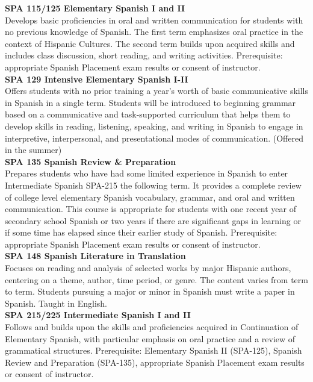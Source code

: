 \documentclass[
  letterpaper,
]{scrbook}
\begin{document}
\textbf{SPA 115/125 Elementary Spanish I and II}\\
Develops basic proficiencies in oral and written communication for
students with no previous knowledge of Spanish. The first term
emphasizes oral practice in the context of Hispanic Cultures. The second
term builds upon acquired skills and includes class discussion, short
reading, and writing activities. Prerequisite: appropriate Spanish
Placement exam results or consent of instructor.\\
\textbf{SPA 129 Intensive Elementary Spanish I-II}\\
Offers students with no prior training a year's worth of basic
communicative skills in Spanish in a single term. Students will be
introduced to beginning grammar based on a communicative and
task-supported curriculum that helps them to develop skills in reading,
listening, speaking, and writing in Spanish to engage in interpretive,
interpersonal, and presentational modes of communication. (Offered in
the summer)\\
\textbf{SPA 135 Spanish Review \& Preparation}\\
Prepares students who have had some limited experience in Spanish to
enter Intermediate Spanish SPA-215 the following term. It provides a
complete review of college level elementary Spanish vocabulary, grammar,
and oral and written communication. This course is appropriate for
students with one recent year of secondary school Spanish or two years
if there are significant gaps in learning or if some time has elapsed
since their earlier study of Spanish. Prerequisite: appropriate Spanish
Placement exam results or consent of instructor.\\
\textbf{SPA 148 Spanish Literature in Translation}\\
Focuses on reading and analysis of selected works by major Hispanic
authors, centering on a theme, author, time period, or genre. The
content varies from term to term. Students pursuing a major or minor in
Spanish must write a paper in Spanish. Taught in English.\\
\textbf{SPA 215/225 Intermediate Spanish I and II }\\
Follows and builds upon the skills and proficiencies acquired in
Continuation of Elementary Spanish, with particular emphasis on oral
practice and a review of grammatical structures. Prerequisite:
Elementary Spanish II (SPA-125), Spanish Review and Preparation
(SPA-135), appropriate Spanish Placement exam results or consent of
instructor.\\
\end{document}

